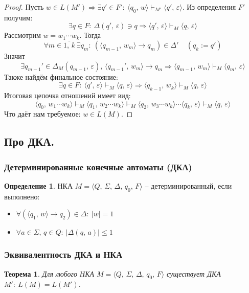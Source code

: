 \documentclass[a4paper,12pt]{article}
\renewcommand{\leq}{\ensuremath{\leqslant}}
\theoremstyle{plain}
\newtheorem{theorem}{Теорема}[subsection]
\theoremstyle{definition}
\newtheorem{definition}{Определение}[subsection]
\theoremstyle{remark}
\begin{document}
\begin{proof}
	Пусть $w \in L(M') \Rightarrow \exists q' \in F':\: \langle q_0,\, w\rangle \vdash_{M'} \langle q',\, \varepsilon\rangle$. Из определения $F'$ получим:
	\[
		\exists q \in F :\: \Delta(q',\,\varepsilon) \ni q \Rightarrow \langle q',\, \varepsilon\rangle \vdash_M \langle q,\, \varepsilon\rangle
	\]
	Рассмотрим $w = w_1\cdots w_k$. Тогда
	\[
		\forall m \in \overline{1,\,k} \: \exists q_m :\: (\langle q_{m-1},\, w_m\rangle \to q_m) \in \Delta' \;\;\;\; (q_k := q')
	\]
	Значит
	\[
		\exists q_{m - 1}' \in \Delta_M(q_{m - 1},\, \varepsilon),\, \langle q_{m - 1}',\, w_m\rangle \to q_m \Rightarrow \langle q_{m - 1},\, w_m\rangle \vdash_M \langle q_m,\, \varepsilon\rangle
	\]
	Также найдём финальное состояние:
	\[
		\exists q \in F :\: \langle q',\, \varepsilon\rangle \vdash_M \langle q,\, \varepsilon\rangle \Rightarrow \langle q_{k - 1},\, w_k\rangle \vdash_M \langle q,\, \varepsilon\rangle
	\]
	Итоговая цепочка отношений имеет вид:
	\[
		\langle q_0,\, w_1\cdots w_k\rangle \vdash_M \langle q_1,\, w_2\cdots w_k\rangle \vdash_M \langle q_2,\, w_3\cdots w_k\rangle\cdots \langle q_k,\, \varepsilon\rangle \vdash_M \langle q,\, \varepsilon\rangle
	\]
	Что даёт нам требуемое: $w \in L(M)$.
\end{proof}

\subsection{Про ДКА.}
\subsubsection*{Детерминированные конечные автоматы (ДКА)}
\begin{definition}
	НКА $M = \langle Q,\,\Sigma,\, \Delta,\, q_0,\, F \rangle$ -- детерминированный, если выполнено:
	\begin{itemize}
		\item $\forall (\langle q_1,\, w\rangle \to q_2) \in \Delta :\: |w| = 1$
		\item $\forall a \in \Sigma,\, q \in Q :\: |\Delta(q,\, a)| \leq 1$
	\end{itemize}
\end{definition}

\subsubsection*{Эквивалентность ДКА и НКА}
\begin{theorem}
	Для любого НКА $M = \langle Q,\,\Sigma,\, \Delta,\, q_0,\, F \rangle$ существует ДКА $M' :\: L(M) = L(M')$.
\end{theorem}
\end{document}
